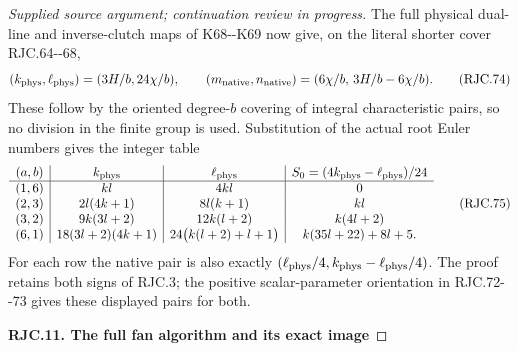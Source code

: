 \begin{proof}[Supplied source argument; continuation review in progress]
The full physical dual-line and inverse-clutch
maps of K68-\/-K69 now give, on the literal
shorter cover RJC.64-\/-68,
\[
 (k_{\rm phys},\ell_{\rm phys})
   =(3H/b,24\chi/b),\qquad
 (m_{\rm native},n_{\rm native})
   =(6\chi/b,\,3H/b-6\chi/b).
 \tag{RJC.74}
\]
These follow by the oriented degree-\(b\)
covering of integral characteristic pairs,
so no division in the finite group is used.
Substitution of the actual root Euler
numbers gives the integer table
\[
 \begin{array}{c|c|c|c}
 (a,b)&k_{\rm phys}&\ell_{\rm phys}&
 S_0=(4k_{\rm phys}-\ell_{\rm phys})/24\\ \hline
 (1,6)&kl&4kl&0\\
 (2,3)&2l(4k+1)&8l(k+1)&kl\\
 (3,2)&9k(3l+2)&12k(l+2)&k(4l+2)\\
 (6,1)&18(3l+2)(4k+1)&
 24\bigl(k(l+2)+l+1\bigr)&k(35l+22)+8l+5.
 \end{array}
 \tag{RJC.75}
\]
For each row the native pair is also exactly
\((\ell_{\rm phys}/4,
k_{\rm phys}-\ell_{\rm phys}/4)\).
The proof retains both signs of RJC.3;
the positive scalar-parameter orientation
in RJC.72-\/-73 gives these displayed pairs
for both.

\par

\medskip\noindent\textbf{RJC.11. The full fan algorithm and its exact image}

\par\nobreak


\end{proof}
